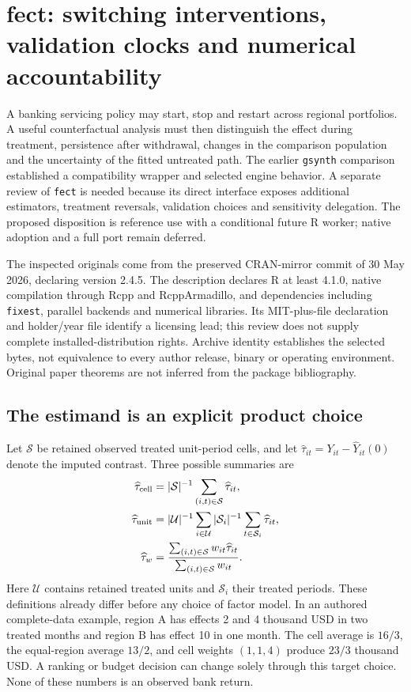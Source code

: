 \section{fect: switching interventions, validation clocks and numerical accountability}
\label{sec:exec24-fect-reuse}

A banking servicing policy may start, stop and restart across regional
portfolios. A useful counterfactual analysis must then distinguish the effect
during treatment, persistence after withdrawal, changes in the comparison
population and the uncertainty of the fitted untreated path. The earlier
\texttt{gsynth} comparison established a compatibility wrapper and selected
engine behavior. A separate review of \texttt{fect} is needed because its
direct interface exposes additional estimators, treatment reversals,
validation choices and sensitivity delegation. The proposed disposition is
reference use with a conditional future R worker; native adoption and a full
port remain deferred.\citep{exec21_gsynth_wrapper,exec21_gsynth_engine,exec24_fect_choice}

The inspected originals come from the preserved CRAN-mirror commit of
30 May 2026, declaring version 2.4.5. The description declares R at least
4.1.0, native compilation through Rcpp and RcppArmadillo, and dependencies
including \texttt{fixest}, parallel backends and numerical libraries.
Its MIT-plus-file declaration and holder/year file identify a licensing
lead; this review does not supply complete installed-distribution rights.
Archive identity establishes the selected bytes, not equivalence to every
author release, binary or operating environment. Original paper theorems
are not inferred from the package bibliography.\citep{exec24_fect_source,v12_sw_fect}

\subsection{The estimand is an explicit product choice}
Let $\mathcal S$ be retained observed treated unit-period cells, and let
$\widehat\tau_{it}=Y_{it}-\widehat Y_{it}(0)$ denote the imputed contrast.
Three possible summaries are
\begin{align}
 \widehat\tau_{\rm cell}&=|\mathcal S|^{-1}
      \sum_{(i,t)\in\mathcal S}\widehat\tau_{it},\\
 \widehat\tau_{\rm unit}&=|\mathcal U|^{-1}\sum_{i\in\mathcal U}
      |\mathcal S_i|^{-1}\sum_{t\in\mathcal S_i}\widehat\tau_{it},\\
 \widehat\tau_w&=\frac{\sum_{(i,t)\in\mathcal S}w_{it}\widehat\tau_{it}}
                       {\sum_{(i,t)\in\mathcal S}w_{it}}.
\end{align}
Here $\mathcal U$ contains retained treated units and $\mathcal S_i$ their
treated periods. These definitions already differ before any choice of
factor model. In an authored complete-data example, region A has effects
2 and 4 thousand USD in two treated months and region B has effect 10 in
one month. The cell average is $16/3$, the equal-region average $13/2$,
and cell weights $(1,1,4)$ produce $23/3$ thousand USD. A ranking or budget
decision can change solely through this target choice. None of these
numbers is an observed bank return.\citep{exec24_fect_choice}

